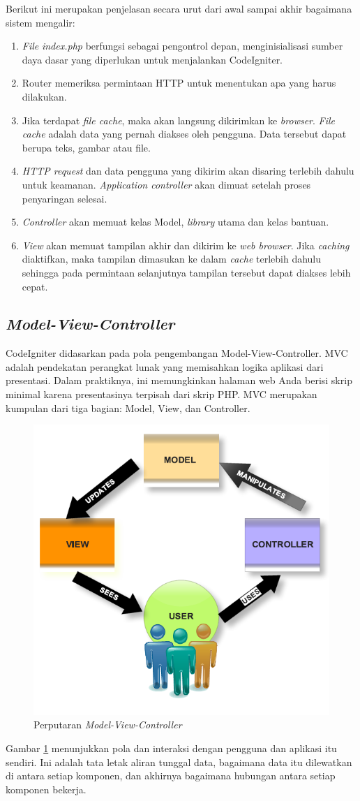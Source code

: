 Berikut ini merupakan penjelasan secara urut dari awal sampai akhir bagaimana sistem mengalir:
\begin{enumerate}
    \item \textit{File} \textit{index.php} berfungsi sebagai pengontrol depan, menginisialisasi sumber daya dasar yang diperlukan untuk menjalankan CodeIgniter.
    \item Router memeriksa permintaan HTTP untuk menentukan apa yang harus dilakukan.
    \item Jika terdapat \textit{file cache}, maka akan langsung dikirimkan ke \textit{browser}. \textit{File cache} adalah data yang pernah diakses oleh pengguna. Data tersebut dapat berupa teks, gambar atau file.
    \item \textit{HTTP request} dan data pengguna yang dikirim akan disaring terlebih dahulu untuk keamanan. \textit{Application controller} akan dimuat setelah proses penyaringan selesai.
    \item \textit{Controller} akan memuat kelas Model, \textit{library} utama dan kelas bantuan.
    \item \textit{View} akan memuat tampilan akhir dan dikirim ke \textit{web browser}. Jika \textit{caching} diaktifkan, maka tampilan dimasukan ke dalam \textit{cache} terlebih dahulu sehingga pada permintaan selanjutnya tampilan tersebut dapat diakses lebih cepat.
\end{enumerate}

\subsection{\textit{Model-View-Controller}}
\label{sec:Model-View-Controller}
CodeIgniter didasarkan pada pola pengembangan Model-View-Controller\cite{codeigniter}. MVC adalah pendekatan perangkat lunak yang memisahkan logika aplikasi dari presentasi. Dalam praktiknya, ini memungkinkan halaman web Anda berisi skrip minimal karena presentasinya terpisah dari skrip PHP.  MVC merupakan kumpulan dari tiga bagian: Model, View, dan Controller. 

 \begin{figure}[h!]
     \centering
     \includegraphics[width=0.5\linewidth]{Gambar/MVC.PNG}
     \caption{Perputaran \textit{Model-View-Controller}}
     \label{fig:label}
 \end{figure}
Gambar \ref{fig:label} menunjukkan pola dan interaksi dengan pengguna dan aplikasi itu sendiri. Ini adalah tata letak aliran tunggal data, bagaimana data itu dilewatkan di antara setiap komponen, dan akhirnya bagaimana hubungan antara setiap komponen bekerja. 


